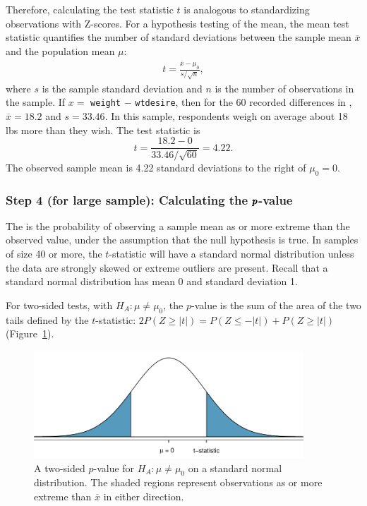 Therefore, calculating the test statistic $t$ is analogous to standardizing observations with Z-scores. For a hypothesis testing of the mean, the mean  test statistic quantifies the number of standard deviations between the sample mean $\overline{x}$ and the population mean $\mu$:
\begin{align*}
t=\frac{\overline{x}-\mu_0}{s/\sqrt{n}},
\end{align*}
where $s$ is the sample standard deviation and $n$ is the number of observations in the sample.  If $x =$ \texttt{weight} $-$ \texttt{wtdesire}, then for the 60 recorded differences in , $\overline{x} = 18.2$ and $s = 33.46$.  In this sample, respondents weigh on average about 18\,lbs more than they wish. The test statistic is 
\[t = \frac{18.2 - 0}{33.46/\sqrt{60}} = 4.22.\]
The observed sample mean is 4.22 standard deviations to the right of $\mu_0 = 0$.




\subsubsection{Step 4 (for large sample): Calculating the $\pmb{\MakeLowercase{p}}$-value}

The  is the probability of observing a sample mean as or more extreme than the observed value, under the assumption that the null hypothesis is true. In samples of size 40 or more, the $t$-statistic will have a standard normal distribution unless the data are strongly skewed or extreme outliers are present. Recall that a standard normal distribution has mean 0 and standard deviation 1.

For two-sided tests, with $H_A: \mu \neq \mu_0$, the $p$-value is the sum of the area of the two tails defined by the $t$-statistic: $2 P(Z \geq |t|) = P(Z \leq -|t|) + P(Z \geq |t|)$ (Figure~\ref{pValueTwoSided}).

\begin{figure}[h]
	\centering
	\includegraphics[width=0.9\textwidth]{ch_05a_inference_foundations_oi_biostat/figures/pValueTwoSided/pValueTwoSided}
	\caption{A two-sided $p$-value for $H_A: \mu \neq \mu_0$ on a standard normal distribution. The shaded regions represent observations as or more extreme than $\overline{x}$ in either direction.}
	\label{pValueTwoSided}
\end{figure}

